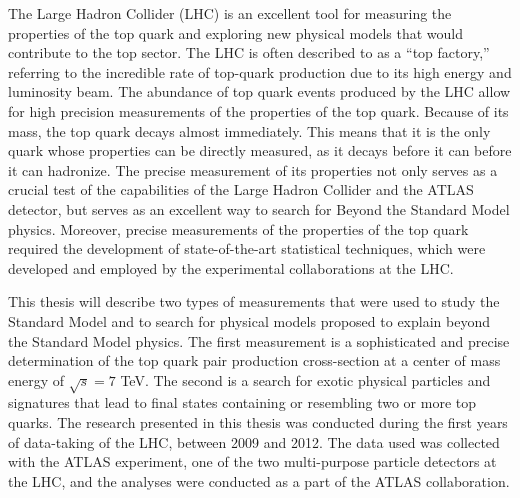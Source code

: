 
The Large Hadron Collider (LHC) is an excellent tool for measuring the properties of the top quark
and exploring new physical models that would contribute to the top sector.
The LHC is often described to as a ``top factory,'' referring to the incredible rate of top-quark production due to its high energy and luminosity beam.
The abundance of top quark events produced by the LHC allow for high precision measurements of the properties of the top quark.
Because of its mass, the top quark decays almost immediately.
This means that it is the only quark whose properties can be directly measured, as it decays before it can before it can hadronize.
The precise measurement of its properties not only serves as a crucial test of the capabilities of the Large Hadron Collider and the ATLAS detector,
but serves as an excellent way to search for Beyond the Standard Model physics.
Moreover, precise measurements of the properties of the top quark required the development of state-of-the-art statistical techniques,
which were developed and employed by the experimental collaborations at the LHC.

This thesis will describe two types of measurements that were used to study the Standard Model and to search for physical models proposed to explain beyond the Standard Model physics.
The first measurement is a sophisticated and precise determination of the top quark pair production cross-section at a center of mass energy of $\sqrt{s} = 7$ TeV.
The second is a search for exotic physical particles and signatures that lead to final states containing or resembling two or more top quarks.
The research presented in this thesis was conducted during the first years of data-taking of the LHC, between 2009 and 2012.
The data used was collected with the ATLAS experiment, one of the two multi-purpose particle detectors at the LHC,
and the analyses were conducted as a part of the ATLAS collaboration.

